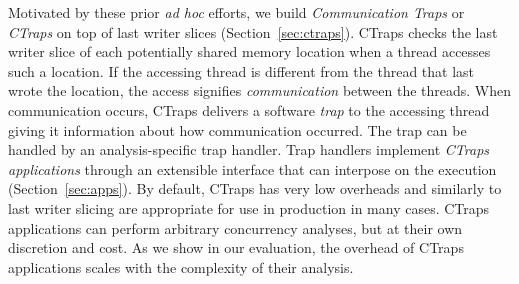 \documentclass[preprint,9pt]{sigplanconf}
\newcommand{\ctraps}{CTraps\xspace}
\begin{document}
Motivated by these prior {\em ad hoc} efforts, we build {\em Communication
Traps} or {\em \ctraps}  on top of last writer slices
(Section~\ref{sec:ctraps}).  \ctraps checks the last writer slice of each
potentially shared memory location when a thread accesses such a location.  If
the accessing thread is different from the thread that last wrote the location,
the access signifies {\em communication} between the threads.  When
communication occurs, \ctraps delivers a software {\em trap} to the accessing
thread giving it information about how communication occurred.  The trap can be
handled by an analysis-specific trap handler.  Trap handlers implement {\em
\ctraps applications} through an extensible interface that can interpose on the
execution (Section~\ref{sec:apps}).  By default, \ctraps has very low overheads
and similarly to last writer slicing are appropriate for use in production in
many cases.  \ctraps applications can perform arbitrary concurrency analyses,
but at their own discretion and cost.  As we show in our evaluation, the
overhead of \ctraps applications scales with the complexity of their analysis.



%
\end{document}
